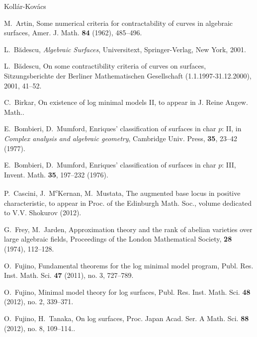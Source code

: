 \documentclass[12pt,twoside]{amsart}
\theoremstyle{definition}
\begin{document}
\begin{thebibliography}{Koll\'ar-Kov\'acs}

{M.~Artin},
Some numerical criteria for contractability of curves in algebraic surfaces, 
{Amer. J. Math. {\textbf{84}} (1962), 485--496}.


{L.~B\u{a}descu},
{\em Algebraic Surfaces}, 
{Universitext, Springer-Verlag, New York, 2001}.

{L.~B\u{a}descu},
{On some contractibility criteria of curves on surfaces}, 
{Sitzungsberichte der Berliner Mathematischen Gesellschaft (1.1.1997-31.12.2000), 2001, 41--52.}

{C.~Birkar},
On existence of log minimal models II,
{to appear in J. Reine Angew. Math.}.


{E.~Bombieri, D.~Mumford},
Enriques' classification of surfaces in char $p$: II,
{in {\em Complex analysis and algebraic geometry}, 
Cambridge  Univ. Press, {\textbf{35}}, 23--42 (1977)}.


{E.~Bombieri, D.~Mumford},
Enriques' classification of surfaces in char $p$: III,
{Invent. Math. {\textbf{35}}, 197--232 (1976)}.


{P.~Cascini, J.~M\textsuperscript{c}Kernan, M.~Mustata},
The augmented base locus in positive characteristic, 
{to appear in Proc. of the Edinburgh Math. Soc., volume dedicated to V.V. Shokurov (2012).}




{G.~Frey, M.~Jarden},
Approximation theory and the rank of abelian varieties 
over large algebraic fields,
{Proceedings of the London Mathematical Society, {\textbf{28}} (1974), 112--128}.


{O.~Fujino},
Fundamental theorems for the log minimal model program, 
{Publ. Res. Inst. Math. Sci. {\textbf{47}} (2011), no. 3, 727--789.}


{O.~Fujino},
Minimal model theory for log surfaces, 
{Publ. Res. Inst. Math. Sci. {\textbf{48}} (2012), no. 2, 339--371.}


{O.~Fujino, H.~Tanaka},
On log surfaces, 
{Proc. Japan Acad. Ser. A Math. Sci. {\textbf{88}} (2012), no. 8, 109--114.}.



\end{thebibliography}
\end{document}

